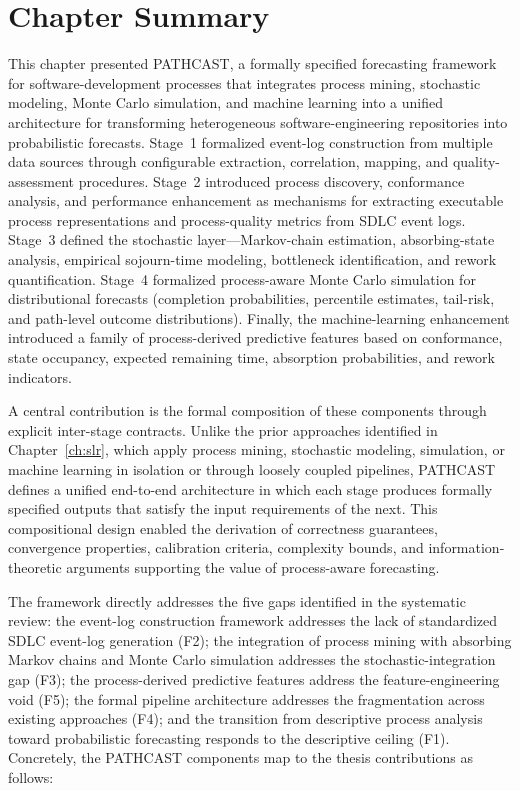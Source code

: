 \section{Chapter Summary}
\label{sec:method-summary}

This chapter presented PATHCAST, a formally specified forecasting framework
for software-development processes that integrates process mining,
stochastic modeling, Monte Carlo simulation, and machine learning into a
unified architecture for transforming heterogeneous software-engineering
repositories into probabilistic forecasts. Stage~1 formalized event-log
construction from multiple data sources through configurable extraction,
correlation, mapping, and quality-assessment procedures. Stage~2 introduced
process discovery, conformance analysis, and performance enhancement as
mechanisms for extracting executable process representations and
process-quality metrics from SDLC event logs. Stage~3 defined the stochastic
layer---Markov-chain estimation, absorbing-state analysis, empirical
sojourn-time modeling, bottleneck identification, and rework
quantification. Stage~4 formalized process-aware Monte Carlo simulation for
distributional forecasts (completion probabilities, percentile estimates,
tail-risk, and path-level outcome distributions). Finally, the
machine-learning enhancement introduced a family of process-derived
predictive features based on conformance, state occupancy, expected
remaining time, absorption probabilities, and rework indicators.

A central contribution is the formal composition of these components through
explicit inter-stage contracts. Unlike the prior approaches identified in
Chapter~\ref{ch:slr}, which apply process mining, stochastic modeling,
simulation, or machine learning in isolation or through loosely coupled
pipelines, PATHCAST defines a unified end-to-end architecture in which each
stage produces formally specified outputs that satisfy the input
requirements of the next. This compositional design enabled the derivation
of correctness guarantees, convergence properties, calibration criteria,
complexity bounds, and information-theoretic arguments supporting the value
of process-aware forecasting.

The framework directly addresses the five gaps identified in the systematic
review: the event-log construction framework addresses the lack of
standardized SDLC event-log generation (F2); the integration of process
mining with absorbing Markov chains and Monte Carlo simulation addresses the
stochastic-integration gap (F3); the process-derived predictive features
address the feature-engineering void (F5); the formal pipeline architecture
addresses the fragmentation across existing approaches (F4); and the
transition from descriptive process analysis toward probabilistic
forecasting responds to the descriptive ceiling (F1). Concretely, the
PATHCAST components map to the thesis contributions as follows:

